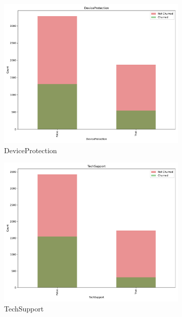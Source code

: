 \documentclass[a4paper,11pt]{article}
\begin{document}
\begin{landscape}
\begin{figure}
\begin{subfigure}{0.14\linewidth}
    \includegraphics[width=\linewidth]{figures/understanding/DeviceProtection.pdf}
    \caption{DeviceProtection}
\end{subfigure}
\begin{subfigure}{0.14\linewidth}
    \includegraphics[width=\linewidth]{figures/understanding/TechSupport.pdf}
    \caption{TechSupport}
\end{subfigure}
\begin{subfigure}{0.14\linewidth}

\end{subfigure}
\end{figure}
\end{landscape}
\end{document}
